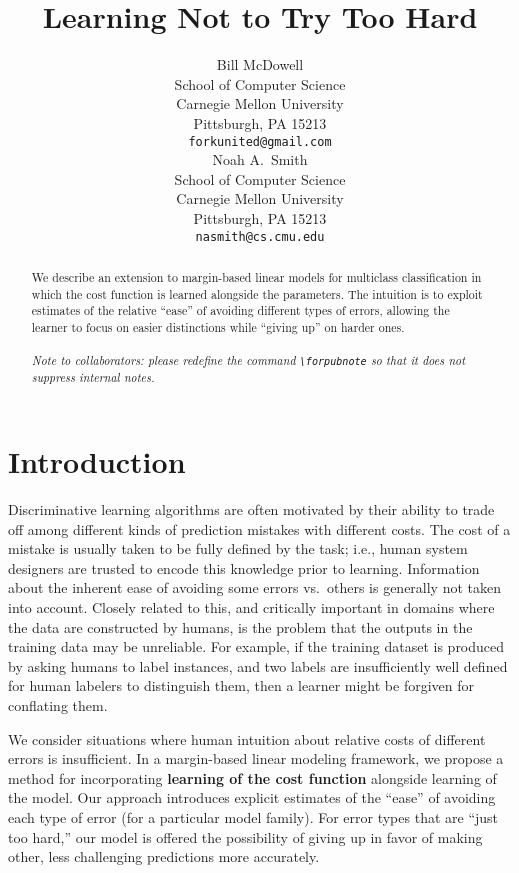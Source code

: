 \documentclass{article} %
\title{Learning Not to Try Too Hard}
\author{
Bill McDowell \\
School of Computer Science\\
Carnegie Mellon University\\
Pittsburgh, PA 15213 \\
\texttt{forkunited@gmail.com} \\
\And
Noah A.~Smith \\
School of Computer Science\\
Carnegie Mellon University\\
Pittsburgh, PA 15213 \\
\texttt{nasmith@cs.cmu.edu} \\
}
\begin{document}
\maketitle


\begin{abstract}
We describe an extension to margin-based linear models for multiclass classification in which the
cost function is learned alongside the parameters.  The intuition is
to exploit estimates of the relative ``ease'' of avoiding different
types of errors, allowing the learner to focus on easier
distinctions while ``giving up'' on harder ones. \\ \ \\
\emph{Note to collaborators:  please redefine the command 
  \texttt{\textbackslash{}forpubnote} so that it does not suppress internal notes.}
\end{abstract}

\section{Introduction}

Discriminative learning algorithms are often motivated by their
ability to trade off among different kinds of prediction mistakes with
different costs.  The cost of a mistake is usually taken to be fully
defined by the task; i.e., human system designers are trusted to
encode this knowledge prior to learning.  Information about the
inherent ease of avoiding some errors vs.~others is generally not
taken into account.   Closely related to this, and critically
important in domains where the data are constructed by humans, is the
problem that the outputs in the training data may be unreliable.  For
example, if the training dataset is produced by asking humans to label
instances, and two labels are insufficiently well defined for human
labelers to distinguish them,
then a learner might be forgiven for conflating them.

We consider situations where human intuition about relative costs of
different errors is insufficient.  In a margin-based linear modeling
framework, we propose a method for incorporating \textbf{learning of
  the cost function} alongside learning of the model.  Our approach
introduces explicit estimates of the ``ease'' of avoiding each type of
error
(for a particular model family).   For error types that are ``just too
hard,'' our model is offered the possibility of giving up in favor of
making other, less challenging predictions more accurately.
\end{document}
